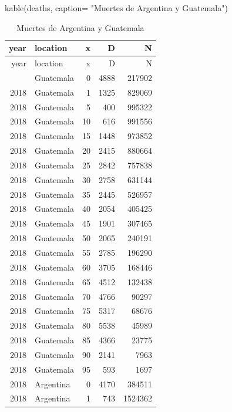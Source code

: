 \documentclass[
  letterpaper,
  DIV=11,
  numbers=noendperiod]{scrartcl}
\newenvironment{Shaded}{\begin{snugshade}}{\end{snugshade}}
\newcommand{\AttributeTok}[1]{\textcolor[rgb]{0.40,0.45,0.13}{#1}}
\newcommand{\FunctionTok}[1]{\textcolor[rgb]{0.28,0.35,0.67}{#1}}
\newcommand{\NormalTok}[1]{\textcolor[rgb]{0.00,0.23,0.31}{#1}}
\newcommand{\StringTok}[1]{\textcolor[rgb]{0.13,0.47,0.30}{#1}}
\begin{document}
\begin{Shaded}
\begin{Highlighting}[]
\FunctionTok{kable}\NormalTok{(deaths, }\AttributeTok{caption=} \StringTok{"Muertes de Argentina y Guatemala"}\NormalTok{) }
\end{Highlighting}
\end{Shaded}

\begin{longtable}[]{@{}rlrrr@{}}
\caption{Muertes de Argentina y Guatemala}\tabularnewline
\toprule\noalign{}
year & location & x & D & N \\
\midrule\noalign{}
\endfirsthead
\toprule\noalign{}
year & location & x & D & N \\
\midrule\noalign{}
\endhead
\bottomrule\noalign{}
\endlastfoot
2018 & Guatemala & 0 & 4888 & 217902 \\
2018 & Guatemala & 1 & 1325 & 829069 \\
2018 & Guatemala & 5 & 400 & 995322 \\
2018 & Guatemala & 10 & 616 & 991556 \\
2018 & Guatemala & 15 & 1448 & 973852 \\
2018 & Guatemala & 20 & 2415 & 880664 \\
2018 & Guatemala & 25 & 2842 & 757838 \\
2018 & Guatemala & 30 & 2758 & 631144 \\
2018 & Guatemala & 35 & 2445 & 526957 \\
2018 & Guatemala & 40 & 2054 & 405425 \\
2018 & Guatemala & 45 & 1901 & 307465 \\
2018 & Guatemala & 50 & 2065 & 240191 \\
2018 & Guatemala & 55 & 2785 & 196290 \\
2018 & Guatemala & 60 & 3705 & 168446 \\
2018 & Guatemala & 65 & 4512 & 132438 \\
2018 & Guatemala & 70 & 4766 & 90297 \\
2018 & Guatemala & 75 & 5317 & 68676 \\
2018 & Guatemala & 80 & 5538 & 45989 \\
2018 & Guatemala & 85 & 4366 & 23775 \\
2018 & Guatemala & 90 & 2141 & 7963 \\
2018 & Guatemala & 95 & 593 & 1697 \\
2018 & Argentina & 0 & 4170 & 384511 \\
2018 & Argentina & 1 & 743 & 1524362 \\

\end{longtable}
\end{document}
